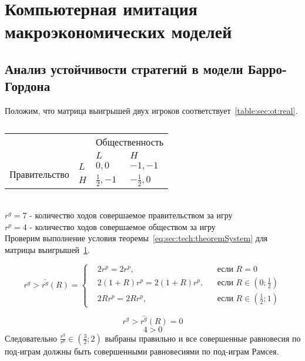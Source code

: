 \section{Компьютерная имитация макроэкономических моделей} 

\subsection{Анализ устойчивости стратегий в модели Барро-Гордона}
Положим, что матрица выигрышей двух игроков соответствует~\ref{table:sec:ot:real}.\\
\begin{table}[h]
	\centering
	\begin{tabular}{|l|l|l|l|}
		\hline
		\multicolumn{2}{|l|}{\multirow{2}{*}{}} & \multicolumn{2}{l|}{Общественность} \\ \cline{3-4} 
		\multicolumn{2}{|l|}{}                  & $L$            & $H$            \\ \hline
		\multirow{2}{*}{Правительство}     & $L$     & $0,0$          & $-1,-1$          \\ \cline{2-4} 
		& $H$     & $\frac{1}{2},-1$          & $-\frac{1}{2},0$          \\ \hline
	\end{tabular}
	\caption{}	
	\label{table:sec:ot:real1}
\end{table}\\
$r^g= 7 $ - количество ходов совершаемое  правительством за игру\\
$r^p= 4 $ - количество ходов совершаемое  обществом за игру\\
Проверим выполнение условия теоремы~\ref{eq:sec:tech:theoremSystem} для матрицы выигрышей~\ref{table:sec:ot:real1}. 

$$
r^g> \bar{r^g}(R) = \left\{ 
\begin{aligned} 
&2r^p= 2r^p, &&\text{если } R=0
\\
&2(1+R)r^p= 2(1+R)r^p, &&\text{если } 	R\in\left(0; \frac{1}{2}\right)
\\
&2Rr^p= 2Rr^p, &&\text{если } 	R\in\left( \frac{1}{2};1\right)
\end{aligned}
\right.		
$$

$$
r^g> \bar{r^g}(R) = 0$$
$$
4 > 0
$$
Следовательно $\frac{r^g}{r^p} \in \left(\frac{3}{2};2\right)$ выбраны правильно и все совершенные равновесия по под-играм должны быть совершенными равновесиями по под-играм Рамсея. \\
 
